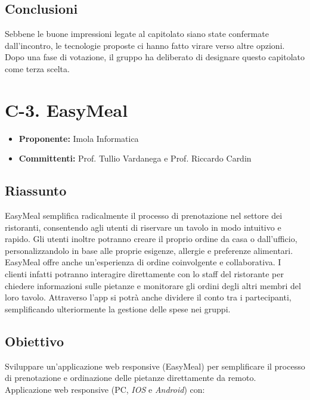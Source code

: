 \documentclass{article}
\begin{document}
\subsection{Conclusioni}
Sebbene le buone impressioni legate al capitolato siano state confermate dall’incontro, le tecnologie proposte ci hanno fatto virare verso altre opzioni. Dopo una fase di votazione, il gruppo ha deliberato di designare questo capitolato come terza scelta.

\newpage

\section{C-3. EasyMeal}
\begin{itemize}
    \item \textbf{Proponente:} Imola Informatica
    \item \textbf{Committenti:}  Prof. Tullio Vardanega e Prof. Riccardo Cardin
\end{itemize}

\subsection{Riassunto}
EasyMeal semplifica radicalmente il processo di prenotazione nel settore dei ristoranti, consentendo agli utenti di riservare un tavolo in modo intuitivo e rapido. 
Gli utenti inoltre potranno creare il proprio ordine da casa o dall'ufficio, personalizzandolo in base alle proprie esigenze, allergie e preferenze alimentari.
EasyMeal offre anche un'esperienza di ordine coinvolgente e collaborativa. I clienti infatti potranno interagire direttamente con lo staff del ristorante per chiedere informazioni sulle pietanze e monitorare gli ordini degli altri membri del loro tavolo.
Attraverso l'app si potrà anche dividere il conto tra i partecipanti, semplificando ulteriormente la gestione delle spese nei gruppi.

\subsection{Obiettivo}
Sviluppare un’applicazione web responsive (EasyMeal) per semplificare il processo di prenotazione e ordinazione delle pietanze direttamente da remoto.
Applicazione web responsive (PC, \textit{IOS} e \textit{Android}) con:
\end{document}
